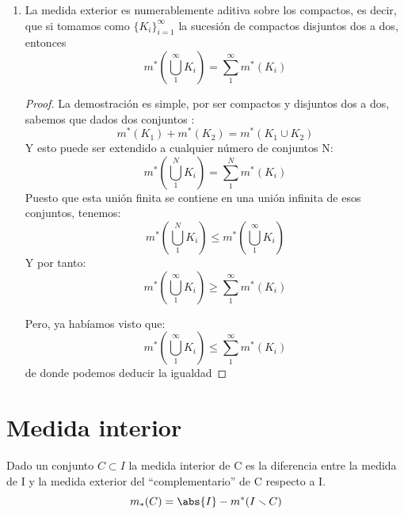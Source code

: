 \documentclass{apuntes}
\begin{document}
\begin{enumerate}
\begin{proof}
Si comprobamos que esto se cumple para cualquier $\epsilon$ tendremos la igualdad, puesto que podremos tomar un $\epsilon$ infinitamente pequeño.

Dado $\epsilon > 0 \ \exists O$ abierto tal que $C_1 \cup C_2 \subset O$, entonces, como ya comprobamos, tenemos que:
\[m^*(O) \leq m^*(C_1 \cup C_2) + \epsilon  \ \forall \epsilon\]

Ahora definimos:
\[\rho = \mop{dist}(C_1, C_2)\]
\[O_1 = O \cap \lbrace x \tq \mop{dist}(x, C_1) < \frac{\rho}{2} \rbrace\]
\[O_2 = O \cap \lbrace x \tq \mop{dist}(x, C_2) < \frac{\rho}{2} \rbrace\]
Siendo estos dos conjuntos disjuntos y abiertos.

Como $C_1 \subset O_1$ y $C_2 \subset O_2$ por construcción, tenemos:
\[m^*(C_1) + m^*(C_2) \leq m^*(O_1) + m^*(O_2) \underbrace{=}_{\text{por ser disjuntos}} m^*(O_1 \cup O_2) \leq m^*(O) < m^*(C_1 \cup C_2) + \epsilon \ \forall \epsilon\]
Por tanto
\[m^*(C_1) + m^*(C_2) = m^*(C_1 \cup C_2)\]
\end{proof}


%
\item La medida exterior es numerablemente aditiva sobre los compactos, es decir, que si tomamos como $\lbrace K_i \rbrace_{i=1}^{\infty}$ la sucesión de compactos disjuntos dos a dos, entonces \[ m^*\left(\bigcup_1^{\infty}K_i\right) = \sum_1^{\infty}m^*(K_i) \]

\begin{proof}
La demostración es simple, por ser compactos y disjuntos dos a dos, sabemos que dados dos conjuntos :
\[m^*(K_1) + m^*(K_2) = m^*(K_1 \cup K_2)\]
Y esto puede ser extendido a cualquier número de conjuntos N:
\[m^*(\bigcup_1^{N}K_i) = \sum_1^{N}m^*(K_i)\]
Puesto que esta unión finita se contiene en una unión infinita de esos conjuntos, tenemos:
\[m^*(\bigcup_1^{N}K_i) \leq m^*(\bigcup_1^{\infty}K_i)\]
Y por tanto:
\[m^*(\bigcup_1^{\infty}K_i) \geq \sum_1^{\infty}m^*(K_i)\]

Pero, ya habíamos visto que:
\[m^*(\bigcup_1^{\infty}K_i) \leq \sum_1^{\infty}m^*(K_i)\]
de donde podemos deducir la igualdad
\end{proof}
\end{enumerate}

\section{Medida interior}
\begin{defn}
Dado un conjunto $C \subset I$ la medida interior de C es la diferencia entre la medida de I y la medida exterior del ``complementario'' de C respecto a I.
\[m_*(C) = \abs{I} - m^*(I \smallsetminus C)\]
\end{defn}
\end{document}
